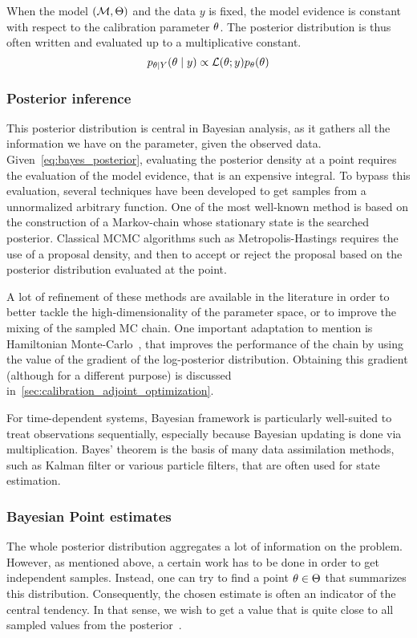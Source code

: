 \documentclass[../../Main_ManuscritThese.tex]{subfiles}
\begin{document}
When the model $(\mathcal{M},\Theta)$ and the data $y$ is fixed, the
model evidence is constant with respect to the calibration parameter
$\theta$. The posterior distribution is thus often written and evaluated
up to a multiplicative constant.
\begin{equation}
p_{\theta \mid Y}(\theta \mid y) \propto \mathcal{L}(\theta;y)p_{\theta}(\theta)
\end{equation}



\subsubsection{Posterior inference}
\label{sec:posterior_inference}
This posterior distribution is central in Bayesian analysis, as it
gathers all the information we have on the parameter, given the
observed data. Given~\cref{eq:bayes_posterior}, evaluating the
posterior density at a point requires the evaluation of the model
evidence, that is an expensive integral. To bypass this evaluation,
several techniques have been developed to get samples from a
unnormalized arbitrary function. One of the most well-known method is
based on the construction of a Markov-chain whose stationary state is
the searched posterior. Classical MCMC algorithms such as
Metropolis-Hastings requires the use of a proposal density, and then
to accept or reject the proposal based on the posterior distribution
evaluated at the point.

A lot of refinement of these methods are available in the literature
in order to better tackle the high-dimensionality of the parameter
space, or to improve the mixing of the sampled MC chain. One important
adaptation to mention is Hamiltonian
Monte-Carlo~\cite{hanson_markov_2001,betancourt_conceptual_2017}, that
improves the performance of the chain by using the value of the
gradient of the log-posterior distribution. Obtaining this gradient
(although for a different purpose) is discussed
in~\cref{sec:calibration_adjoint_optimization}.


For time-dependent systems, Bayesian framework is particularly
well-suited to treat observations sequentially, especially because
Bayesian updating is done via multiplication. Bayes' theorem is the
basis of many data assimilation methods, such as Kalman filter or
various particle filters, that are often used for state estimation.

\subsubsection{Bayesian Point estimates}
\label{sec:bayes_point_estimates}
The whole posterior distribution aggregates a lot of information on
the problem. However, as mentioned above, a certain work has to be
done in order to get independent samples. Instead, one can try to find
a point $\theta \in \Theta$ that summarizes %
this distribution. Consequently, the chosen estimate is often an
indicator of the central tendency. In that sense, we wish to get a
value that is quite close to all sampled values from the
posterior~\cite{lehmann_theory_2006}.
\end{document}
